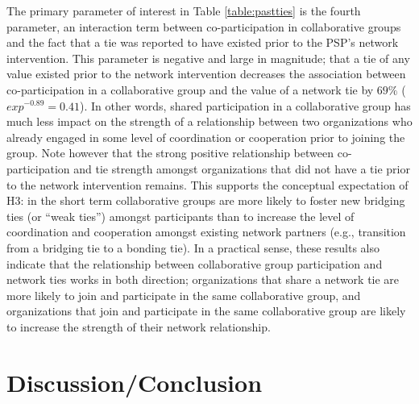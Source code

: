\documentclass[12pt,a4paper,titlepage]{article}
\begin{document}
The primary parameter of interest in Table \ref{table:pastties} is the fourth parameter, an interaction term between co-participation in collaborative groups and the fact that a tie was reported to have existed prior to the PSP's network intervention. This parameter is negative and large in magnitude; that a tie of any value existed prior to the network intervention decreases the association between co-participation in a collaborative group and the value of a network tie by $69\%$ ($exp^{-0.89} = 0.41$). In other words, shared participation in a collaborative group has much less impact on the strength of a relationship between two organizations who already engaged in some level of coordination or cooperation prior to joining the group. Note however that the strong positive relationship between co-participation and tie strength amongst organizations that did not have a tie prior to the network intervention remains. This supports the conceptual expectation of H3: in the short term collaborative groups are more likely to foster new bridging ties (or ``weak ties'') amongst participants than to increase the level of coordination and cooperation amongst existing network partners (e.g., transition from a bridging tie to a bonding tie). In a practical sense, these results also indicate that the relationship between collaborative group participation and network ties works in both direction; organizations that share a network tie are more likely to join and participate in the same collaborative group, and organizations that join and participate in the same collaborative group are likely to increase the strength of their network relationship. 


\section{Discussion/Conclusion}
\end{document}
